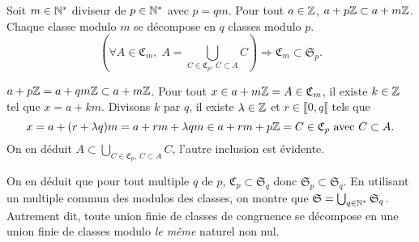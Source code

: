 \begin{propn} \label{décompoClasse}
 Soit $m\in \mathbb{N}^*$ diviseur de $p\in \mathbb{N}^*$ avec $p=qm$.\newline
 Pour tout $a\in \mathbb{Z}$, $a + p\mathbb{Z} \subset a + m\mathbb{Z}$. Chaque classe modulo $m$ se décompose en $q$ classes modulo $p$.
 \begin{displaymath}
  \left( \forall A\in \mathfrak{C}_m, \;  A = \bigcup_{C \in \mathfrak{C}_p,\, C\subset A} C \right) \Rightarrow \mathfrak{C}_m \subset \mathfrak{S}_p.
 \end{displaymath}
\end{propn}
\begin{demo}
 $a + p \mathbb{Z} = a + qm\mathbb{Z} \subset a + m\mathbb{Z}$. Pour tout $x \in  a + m\mathbb{Z} = A \in \mathfrak{C}_m$, il existe $k \in \mathbb{Z}$ tel que $x = a + km$. Divisons $k$ par $q$, il existe $\lambda \in \mathbb{Z}$ et $r \in \llbracket 0, q\llbracket$ tels que
 \begin{displaymath}
  x = a + (r+\lambda q)m = a+rm + \lambda qm \in a+rm + p \mathbb{Z} = C \in \mathfrak{C}_p \text{ avec } C \subset A.
 \end{displaymath}
 On en déduit $A \subset \bigcup_{C \in \mathfrak{C}_p,\, C\subset A} C$, l'autre inclusion est évidente.
\end{demo}
 \label{ExpleZ}
 \noindent On en déduit que pour tout multiple $q$ de $p$, $\mathfrak{C}_p \subset \mathfrak{S}_q$ donc $\mathfrak{S}_p \subset \mathfrak{S}_q$. En utilisant un multiple commun des modulos des classes, on montre que $\mathfrak{S}= \bigcup_{q \in \mathbb{N}^*}\mathfrak{S}_q$. Autrement dit, toute union finie de classes de congruence se décompose en une union finie de classes modulo \emph{le même} naturel non nul.

